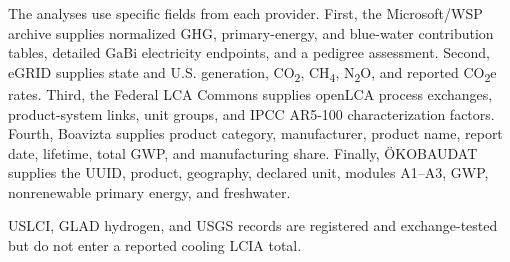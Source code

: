 \documentclass[review,a4paper,fleqn]{cas-sc}
\newcommand{\cotwo}{CO\textsubscript{2}}
\newcommand{\cotwoe}{CO\textsubscript{2}e}
\newcommand{\chfour}{CH\textsubscript{4}}
\newcommand{\ntwoo}{N\textsubscript{2}O}
\begin{document}
The analyses use specific fields from each provider. First, the Microsoft/WSP archive supplies normalized GHG, primary-energy, and blue-water contribution tables, detailed GaBi electricity endpoints, and a pedigree assessment. Second, eGRID supplies state and U.S. generation, \cotwo{}, \chfour{}, \ntwoo{}, and reported \cotwoe{} rates. Third, the Federal LCA Commons supplies openLCA process exchanges, product-system links, unit groups, and IPCC AR5-100 characterization factors. Fourth, Boavizta supplies product category, manufacturer, product name, report date, lifetime, total GWP, and manufacturing share. Finally, ÖKOBAUDAT supplies the UUID, product, geography, declared unit, modules A1--A3, GWP, nonrenewable primary energy, and freshwater.

USLCI, GLAD hydrogen, and USGS records are registered and exchange-tested but do not enter a reported cooling LCIA total.
\end{document}
